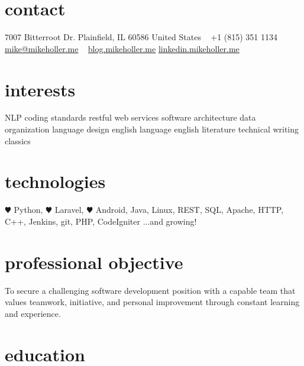 \documentclass[]{friggeri-cv} %
\begin{document}


\begin{aside} %
\section{contact}
7007 Bitterroot Dr.
Plainfield, IL 60586
United States
~
+1 (815) 351 1134
~
\href{mailto:mike@mikeholler.me}{mike@mikeholler.me}
~
\href{http://blog.mikeholler.me}{blog.mikeholler.me}
\href{http://linkedin.mikeholler.me}{linkedin.mikeholler.me}
\section{interests}
NLP
coding standards
restful web services
software architecture
data organization
language design
english language
english literature
technical writing
classics
\section{technologies}
{\color{red} $\varheartsuit$} Python, {\color{red} $\varheartsuit$} Laravel,
{\color{red} $\varheartsuit$} Android, Java, Linux,
REST, SQL, Apache,
HTTP, C++, Jenkins,
git, PHP, CodeIgniter
...and growing!
\end{aside}

\section{professional objective}
To secure a challenging software development position with a capable team that values
teamwork, initiative, and personal improvement through constant learning and experience.


\section{education}
\end{document}
